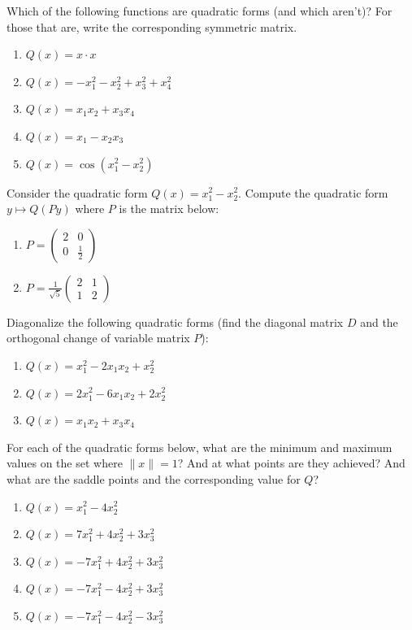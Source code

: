 \begin{enumerate}
    \Problem Which of the following functions are quadratic forms (and which aren't)? For those that are, write the corresponding symmetric matrix.
    \begin{enumerate}
        \item $Q(x) = x \cdot x$\vfill
        \item $Q(x) = -x_1^2 - x_2^2 + x_3^2 + x_4^2$\vfill
        \item $Q(x) = x_1x_2 + x_3x_4$\vfill
        \item $Q(x) = x_1 - x_2x_3$\vfill
        \item $Q(x) = \cos(x_1^2 - x_2^2)$\vfill
    \end{enumerate}

\newpage

    \Problem Consider the quadratic form $Q(x) = x_1^2 - x_2^2$. Compute the quadratic form $y \mapsto Q(Py)$ where $P$ is the matrix below:
    \begin{enumerate}
        \item $P = \begin{pmatrix} 2 & 0 \\ 0 & \frac{1}{2} \end{pmatrix}$\vfill
        \item $P = \frac{1}{\sqrt{5}} \begin{pmatrix} 2 & 1 \\ 1 & 2 \end{pmatrix}$\vfill
    \end{enumerate}

    \Problem Diagonalize the following quadratic forms (find the diagonal matrix $D$ and the orthogonal change of variable matrix $P$):
    \begin{enumerate}
        \item $Q(x) = x_1^2 - 2x_1x_2 + x_2^2$\vfill
        \item $Q(x) = 2x_1^2 - 6x_1x_2 + 2x_2^2$\vfill
        \item $Q(x) = x_1x_2 + x_3x_4$\vfill
    \end{enumerate}

\newpage
    \Problem For each of the quadratic forms below, what are the minimum and maximum values on the set where $\|x\| = 1$? And at what points are they achieved? And what are the saddle points and the corresponding value for $Q$?
    \begin{enumerate}
        \item $Q(x) = x_1^2 - 4x_2^2$\vfill
        \item $Q(x) = 7x_1^2 + 4x_2^2 + 3x_3^2$\vfill
        \item $Q(x) = -7x_1^2 + 4x_2^2 + 3x_3^2$\vfill
        \item $Q(x) = -7x_1^2 - 4x_2^2 + 3x_3^2$\vfill
        \item $Q(x) = -7x_1^2 - 4x_2^2 - 3x_3^2$\vfill
    \end{enumerate}


\end{enumerate}
